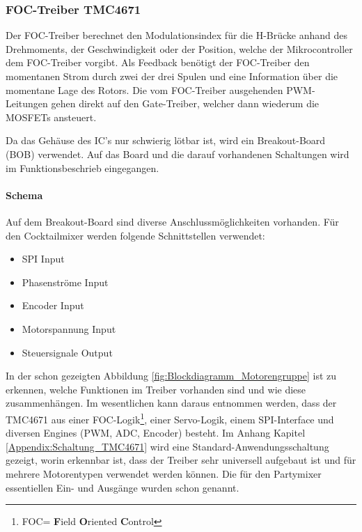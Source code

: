 \subsubsection{FOC-Treiber TMC4671}
\label{subsubsec:FOC-Treiber_TMC4671}

Der FOC-Treiber berechnet den Modulationsindex für die H-Brücke anhand des Drehmoments, der Geschwindigkeit oder der Position, welche der Mikrocontroller dem FOC-Treiber vorgibt. Als Feedback benötigt der FOC-Treiber den momentanen Strom durch zwei der drei Spulen und eine Information über die momentane Lage des Rotors. Die vom FOC-Treiber ausgehenden PWM-Leitungen gehen direkt auf den Gate-Treiber, welcher dann wiederum die MOSFETs ansteuert.

Da das Gehäuse des IC's nur schwierig lötbar ist, wird ein Breakout-Board (BOB) verwendet.
Auf das Board und die darauf vorhandenen Schaltungen wird im Funktionsbeschrieb eingegangen.
\newpage
\paragraph{Schema}\label{par:Schaltungsaufbau_TMC4671}\mbox{}

Auf dem Breakout-Board sind diverse Anschlussmöglichkeiten vorhanden. Für den Cocktailmixer werden folgende Schnittstellen verwendet:

\begin{itemize}
\item SPI Input
\item Phasenströme Input
\item Encoder Input
\item Motorspannung Input
\item Steuersignale Output
\end{itemize}

In der schon gezeigten Abbildung \ref{fig:Blockdiagramm_Motorengruppe} ist zu erkennen, welche Funktionen im Treiber vorhanden sind und wie diese zusammenhängen. Im wesentlichen kann daraus entnommen werden, dass der TMC4671 aus einer FOC-Logik\footnote{FOC= \textbf{F}ield \textbf{O}riented \textbf{C}ontrol}, einer Servo-Logik, einem SPI-Interface und diversen Engines (PWM, ADC, Encoder) besteht. Im Anhang Kapitel \ref{Appendix:Schaltung_TMC4671} wird eine Standard-Anwendungsschaltung gezeigt, worin erkennbar ist, dass der Treiber sehr universell aufgebaut ist und für mehrere Motorentypen verwendet werden können. Die für den Partymixer essentiellen Ein- und Ausgänge wurden schon genannt.

